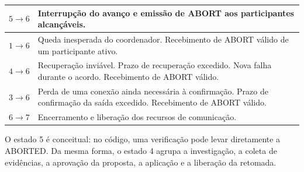 \documentclass[11pt,a4paper]{article}
\begin{document}
\begin{table}[H]
\begin{tabular}{|c|p{11.7cm}|}
        $5 \rightarrow 6$ &
        Interrupção do avanço e emissão de ABORT aos participantes alcançáveis. \\ \hline

        $1 \rightarrow 6$ &
        Queda inesperada do coordenador.
        \newline
        Recebimento de ABORT válido de um participante ativo. \\ \hline

        $4 \rightarrow 6$ &
        Recuperação inviável.
        \newline
        Prazo de recuperação excedido.
        \newline
        Nova falha durante o acordo.
        \newline
        Recebimento de ABORT válido. \\ \hline

        $3 \rightarrow 6$ &
        Perda de uma conexão ainda necessária à confirmação.
        \newline
        Prazo de confirmação da saída excedido.
        \newline
        Recebimento de ABORT válido. \\ \hline

        $6 \rightarrow 7$ &
        Encerramento e liberação dos recursos de comunicação. \\ \hline
    \end{tabular}
\end{table}

O estado 5 é conceitual: no código, uma verificação pode levar diretamente a ABORTED. Da mesma forma, o estado 4 agrupa a investigação, a coleta de evidências, a aprovação da proposta, a aplicação e a liberação da retomada.
\end{document}
